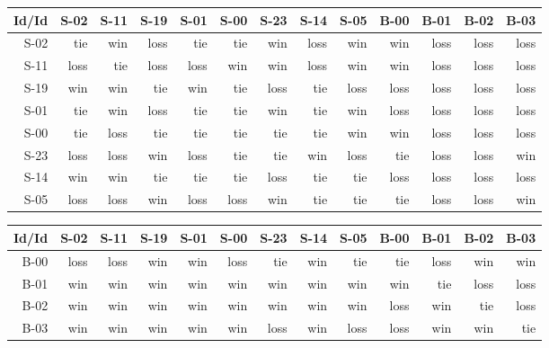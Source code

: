 \begin{tabular}{ | r | r | r | r | r | r | r | r | r | r | r | r | r | }
    \hline
        Id/Id  &   S-02  &   S-11  &   S-19  &   S-01  &   S-00  &   S-23  &   S-14  &   S-05  &   B-00  &   B-01  &   B-02  &   B-03  \\
    \hline
    \hline
         S-02  &    tie  &    win  &   loss  &    tie  &    tie  &    win  &   loss  &    win  &    win  &   loss  &   loss  &   loss  \\
    \hline
         S-11  &   loss  &    tie  &   loss  &   loss  &    win  &    win  &   loss  &    win  &    win  &   loss  &   loss  &   loss  \\
    \hline
         S-19  &    win  &    win  &    tie  &    win  &    tie  &   loss  &    tie  &   loss  &   loss  &   loss  &   loss  &   loss  \\
    \hline
         S-01  &    tie  &    win  &   loss  &    tie  &    tie  &    win  &    tie  &    win  &   loss  &   loss  &   loss  &   loss  \\
    \hline
         S-00  &    tie  &   loss  &    tie  &    tie  &    tie  &    tie  &    tie  &    win  &    win  &   loss  &   loss  &   loss  \\
    \hline
         S-23  &   loss  &   loss  &    win  &   loss  &    tie  &    tie  &    win  &   loss  &    tie  &   loss  &   loss  &    win  \\
    \hline
         S-14  &    win  &    win  &    tie  &    tie  &    tie  &   loss  &    tie  &    tie  &   loss  &   loss  &   loss  &   loss  \\
    \hline
         S-05  &   loss  &   loss  &    win  &   loss  &   loss  &    win  &    tie  &    tie  &    tie  &   loss  &   loss  &    win  \\
    \hline
\end{tabular}


\begin{tabular}{ | r | r | r | r | r | r | r | r | r | r | r | r | r | }
    \hline
        Id/Id  &   S-02  &   S-11  &   S-19  &   S-01  &   S-00  &   S-23  &   S-14  &   S-05  &   B-00  &   B-01  &   B-02  &   B-03  \\
    \hline
    \hline
         B-00  &   loss  &   loss  &    win  &    win  &   loss  &    tie  &    win  &    tie  &    tie  &   loss  &    win  &    win  \\
    \hline
         B-01  &    win  &    win  &    win  &    win  &    win  &    win  &    win  &    win  &    win  &    tie  &   loss  &   loss  \\
    \hline
         B-02  &    win  &    win  &    win  &    win  &    win  &    win  &    win  &    win  &   loss  &    win  &    tie  &   loss  \\
    \hline
         B-03  &    win  &    win  &    win  &    win  &    win  &   loss  &    win  &   loss  &   loss  &    win  &    win  &    tie  \\
    \hline
\end{tabular}


